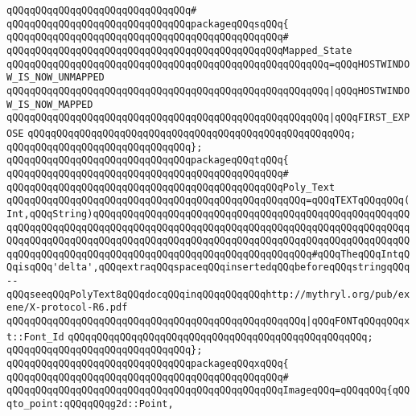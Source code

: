 \verb|qQQqqQQqqQQqqQQqqQQqqQQqqQQqqQQq#|\newline
\verb|qQQqqQQqqQQqqQQqqQQqqQQqqQQqqQQqpackageqQQqsqQQq{|\newline
\verb|qQQqqQQqqQQqqQQqqQQqqQQqqQQqqQQqqQQqqQQqqQQqqQQq#|\newline
\verb|qQQqqQQqqQQqqQQqqQQqqQQqqQQqqQQqqQQqqQQqqQQqqQQqMapped_State|\newline
\verb|qQQqqQQqqQQqqQQqqQQqqQQqqQQqqQQqqQQqqQQqqQQqqQQqqQQqqQQq=qQQqHOSTWINDOW_IS_NOW_UNMAPPED|\newline
\verb|qQQqqQQqqQQqqQQqqQQqqQQqqQQqqQQqqQQqqQQqqQQqqQQqqQQqqQQq|\verb#|qQQqHOSTWINDOW_IS_NOW_MAPPED#\newline
\verb|qQQqqQQqqQQqqQQqqQQqqQQqqQQqqQQqqQQqqQQqqQQqqQQqqQQqqQQq|\verb#|qQQqFIRST_EXPOSE#\newline
\verb|qQQqqQQqqQQqqQQqqQQqqQQqqQQqqQQqqQQqqQQqqQQqqQQqqQQqqQQq;|\newline
\verb|qQQqqQQqqQQqqQQqqQQqqQQqqQQqqQQq};|\newline
\newline
\verb|qQQqqQQqqQQqqQQqqQQqqQQqqQQqqQQqpackageqQQqtqQQq{|\newline
\verb|qQQqqQQqqQQqqQQqqQQqqQQqqQQqqQQqqQQqqQQqqQQqqQQq#|\newline
\verb|qQQqqQQqqQQqqQQqqQQqqQQqqQQqqQQqqQQqqQQqqQQqqQQqPoly_Text|\newline
\verb|qQQqqQQqqQQqqQQqqQQqqQQqqQQqqQQqqQQqqQQqqQQqqQQqqQQq=qQQqTEXTqQQqqQQq(Int,qQQqString)qQQqqQQqqQQqqQQqqQQqqQQqqQQqqQQqqQQqqQQqqQQqqQQqqQQqqQQqqQQqqQQqqQQqqQQqqQQqqQQqqQQqqQQqqQQqqQQqqQQqqQQqqQQqqQQqqQQqqQQqqQQqqQQqqQQqqQQqqQQqqQQqqQQqqQQqqQQqqQQqqQQqqQQqqQQqqQQqqQQqqQQqqQQqqQQqqQQqqQQqqQQqqQQqqQQqqQQqqQQqqQQqqQQqqQQqqQQqqQQqqQQqqQQq#qQQqTheqQQqIntqQQqisqQQq'delta',qQQqextraqQQqspaceqQQqinsertedqQQqbeforeqQQqstringqQQq--qQQqseeqQQqPolyText8qQQqdocqQQqinqQQqqQQqqQQqhttp://mythryl.org/pub/exene/X-protocol-R6.pdf|\newline
\verb|qQQqqQQqqQQqqQQqqQQqqQQqqQQqqQQqqQQqqQQqqQQqqQQqqQQq|\verb#|qQQqFONTqQQqqQQqxt::Font_Id#\newline
\verb|qQQqqQQqqQQqqQQqqQQqqQQqqQQqqQQqqQQqqQQqqQQqqQQqqQQq;|\newline
\verb|qQQqqQQqqQQqqQQqqQQqqQQqqQQqqQQq};|\newline
\newline
\verb|qQQqqQQqqQQqqQQqqQQqqQQqqQQqqQQqpackageqQQqxqQQq{|\newline
\verb|qQQqqQQqqQQqqQQqqQQqqQQqqQQqqQQqqQQqqQQqqQQqqQQq#|\newline
\verb|qQQqqQQqqQQqqQQqqQQqqQQqqQQqqQQqqQQqqQQqqQQqqQQqImageqQQq=qQQqqQQq{qQQqto_point:qQQqqQQqg2d::Point,|\newline
